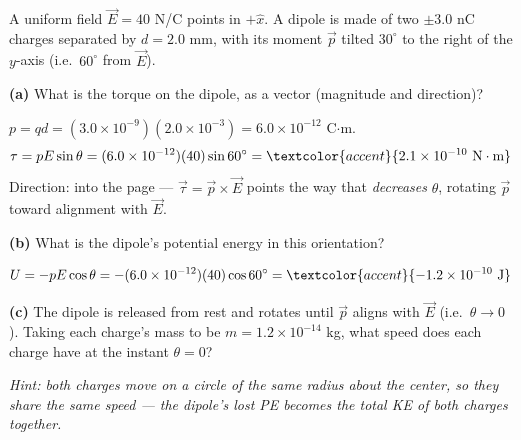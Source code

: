 \documentclass[12pt]{article}
\newcommand{\ANS}[1]{\textcolor{accent}{#1}}
\begin{document}


\prob A uniform field $\vec E = 40$ N/C points in $+\hat x$. A dipole is made of two
$\pm3.0$ nC charges separated by $d=2.0$ mm, with its moment $\vec p$ tilted
$30^\circ$ to the right of the $y$-axis (i.e.\ $60^\circ$ from $\vec E$).

\begin{center}
\end{center}

\textbf{(a)} What is the torque on the dipole, as a vector (magnitude and direction)?

$p = qd = (3.0\times10^{-9})(2.0\times10^{-3}) = 6.0\times10^{-12}$ C$\cdot$m.
\[
\tau = pE\sin\theta = (6.0\times10^{-12})(40)\sin60^\circ = \ANS{2.1\times10^{-10}\text{ N}\cdot\text{m}}
\]
Direction: \ANS{into the page} --- $\vec\tau=\vec p\times\vec E$ points the way that
\emph{decreases} $\theta$, rotating $\vec p$ toward alignment with $\vec E$.

\textbf{(b)} What is the dipole's potential energy in this orientation?

\[
U = -pE\cos\theta = -(6.0\times10^{-12})(40)\cos60^\circ = \ANS{-1.2\times10^{-10}\text{ J}}
\]

\textbf{(c)} The dipole is released from rest and rotates until $\vec p$ aligns with
$\vec E$ (i.e.\ $\theta\to0$). Taking each charge's mass to be $m=1.2\times10^{-14}$
kg, what speed does each charge have at the instant $\theta=0$?

\textit{Hint: both charges move on a circle of the same radius about the center, so
they share the same speed --- the dipole's lost PE becomes the total KE of both
charges together.}
\end{document}
